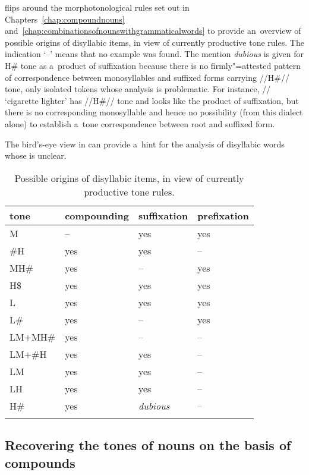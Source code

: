  flips around the morphotonological rules set out in Chapters~\ref{chap:compoundnouns} and~\ref{chap:combinationsofnounswithgrammaticalwords} to provide
an~overview of possible origins of disyllabic items, in view of currently productive tone rules. The
indication ‘–’ means that no example was found. The mention \textit{dubious} is given for H\# tone as a~product of suffixation because there is no firmly"=attested pattern of {correspondence} between monosyllables and suffixed forms carrying \mbox{//H\#//} tone, only isolated tokens whose analysis is problematic. For instance, // ‘cigarette lighter’ has \mbox{//H\#//} tone and looks like the product of {suffixation}, but there is no corresponding {monosyllable} and hence no possibility (from this dialect alone) to establish a~tone {correspondence} between root and suffixed form.

The bird’s-eye view in  can provide a~hint for the analysis of disyllabic words whose  is
unclear. 

\begin{table}%
\caption{Possible origins of disyllabic items, in view of currently productive tone rules.}
\begin{tabularx}{\textwidth}{ Q Q Q Q }
\lsptoprule
	tone & compounding & suffixation & prefixation\\\midrule
	M & -- & yes & yes\\
	\#H & yes & yes & --\\
	MH\# & yes & -- & yes\\
	H\$ & yes & yes & yes\\
	L & yes & yes & yes\\
	L\# & yes & -- & yes\\
	LM+MH\# & yes & -- & --\\
	LM+\#H & yes & yes & --\\
	LM & yes & yes & --\\
	LH & yes & yes & --\\
	H\# & yes & \textit{dubious} & --\\
\lspbottomrule
\end{tabularx}
\label{tab:possibleoriginsofdisyllabicitemsinviewofcurrentlyproductivetonerules}
\end{table}

\subsection{Recovering the tones of nouns on the basis of compounds}
\label{sec:recoveringthetonesofnounsonthebasisofcompounds}

